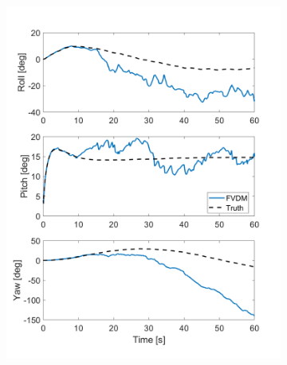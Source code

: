 \begin{figure}[!ht]
    \begin{subfigure}{.45\textwidth}
        \centering
        \includegraphics[width=1\linewidth]{Figures/dynamic/15/EULERANGLES.png}
    \end{subfigure}
    \begin{subfigure}{.45\textwidth}
        \centering

\end{subfigure}
\end{figure}
